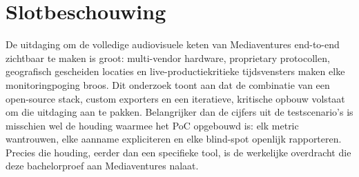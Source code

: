 \section{Slotbeschouwing}
\label{sec:conclusie-slot}

De uitdaging om de volledige audiovisuele keten van Mediaventures end-to-end zichtbaar te maken is groot: multi-vendor hardware, proprietary protocollen, geografisch gescheiden locaties en live-productiekritieke tijdsvensters maken elke monitoringpoging broos. Dit onderzoek toont aan dat de combinatie van een open-source stack, custom exporters en een iteratieve, kritische opbouw volstaat om die uitdaging aan te pakken. Belangrijker dan de cijfers uit de testscenario's is misschien wel de houding waarmee het PoC opgebouwd is: elk metric wantrouwen, elke aanname expliciteren en elke blind-spot openlijk rapporteren. Precies die houding, eerder dan een specifieke tool, is de werkelijke overdracht die deze bachelorproef aan Mediaventures nalaat.
